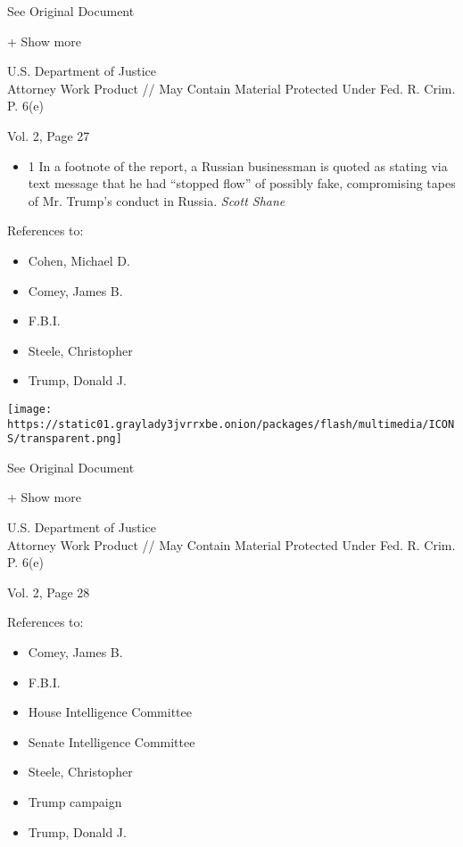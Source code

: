 See Original Document

+ Show more

U.S. Department of Justice\\
Attorney Work Product // May Contain Material Protected Under Fed. R.
Crim. P. 6(e)

Vol. 2, Page 27

\begin{itemize}
\tightlist
\item
  1 In a footnote of the report, a Russian businessman is quoted as
  stating via text message that he had ``stopped flow'' of possibly
  fake, compromising tapes of Mr. Trump's conduct in Russia. \emph{Scott
  Shane}
\end{itemize}

References to:

\begin{itemize}
\tightlist
\item
  Cohen, Michael D.
\item
  Comey, James B.
\item
  F.B.I.
\item
  Steele, Christopher
\item
  Trump, Donald J.
\end{itemize}

\protect\hyperlink{}{}

\texttt{[image: https://static01.graylady3jvrrxbe.onion/packages/flash/multimedia/ICONS/transparent.png]}

See Original Document

+ Show more

U.S. Department of Justice\\
Attorney Work Product // May Contain Material Protected Under Fed. R.
Crim. P. 6(e)

Vol. 2, Page 28

References to:

\begin{itemize}
\tightlist
\item
  Comey, James B.
\item
  F.B.I.
\item
  House Intelligence Committee
\item
  Senate Intelligence Committee
\item
  Steele, Christopher
\item
  Trump campaign
\item
  Trump, Donald J.
\end{itemize}

\protect\hyperlink{}{}

